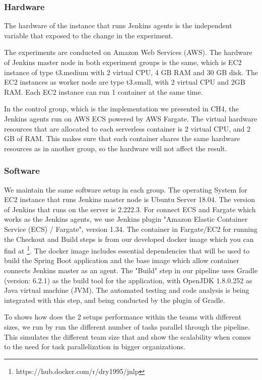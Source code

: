 \subsubsection{Hardware}
The hardware of the instance that runs Jenkins agents is the independent variable that exposed to the change in the experiment.
\par
The experiments are conducted on Amazon Web Services (AWS). The hardware of Jenkins master node in both experiment groups is the same, which is EC2 instance of type t3.medium with 2 virtual CPU, 4 GB RAM and 30 GB disk. The EC2 instances as worker node are type t3.small, with 2 virtual CPU and 2GB RAM. Each EC2 instance can run 1 container at the same time.
\par
In the control group, which is the implementation we presented in CH4, the Jenkins agents run on AWS ECS powered by AWS Fargate. The virtual hardware resources that are allocated to each serverless container is 2 virtual CPU, and 2 GB of RAM. This makes sure that each container shares the same hardware resources as in another group, so the hardware will not affect the result.
\subsubsection{Software}
We maintain the same software setup in each group. The operating System for EC2 instance that runs Jenkins master node is Ubuntu Server 18.04. The version of Jenkins that runs on the server is 2.222.3. For connect ECS and Fargate which works as the Jenkins agents, we use Jenkins plugin "Amazon Elastic Container Service (ECS) / Fargate", version 1.34. The container in Fargate/EC2 for running the Checkout and Build steps is from our developed docker image which you can find at \footnote{https://hub.docker.com/r/dry1995/jnlp}. The docker image includes essential dependencies that will be used to build the Spring Boot application and the base image which allow container connects Jenkins master as an agent. The "Build" step in our pipeline uses Gradle (version: 6.2.1) as the build tool for the application,
with OpenJDK 1.8.0.252 as Java virtual machine (JVM). The automated testing and code analysis is being integrated with this step, and being conducted by the plugin of Gradle.
\par
To shows how does the 2 setups performance within the teams with different sizes, we run by run the different number of tasks parallel through the pipeline. This simulates the different team size that and show the scalability when comes to the need for task parallelization in bigger organizations.

